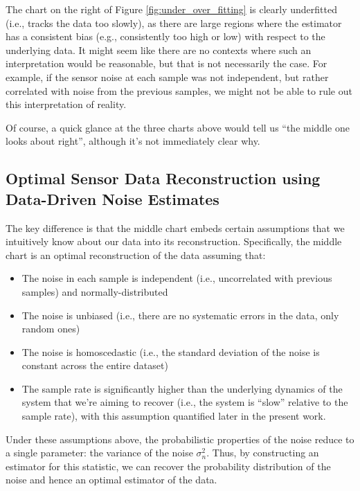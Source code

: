 \documentclass[conf]{new-aiaa}
\begin{document}
    The chart on the right of Figure \ref{fig:under_over_fitting} is clearly underfitted (i.e., tracks the data too slowly), as there are large regions where the estimator has a consistent bias (e.g., consistently too high or low) with respect to the underlying data. It might seem like there are no contexts where such an interpretation would be reasonable, but that is not necessarily the case. For example, if the sensor noise at each sample was not independent, but rather correlated with noise from the previous samples, we might not be able to rule out this interpretation of reality.

    Of course, a quick glance at the three charts above would tell us ``the middle one looks about right'', although it's not immediately clear why.

    \subsection{Optimal Sensor Data Reconstruction using Data-Driven Noise Estimates}
    \label{subsec:optimal_sensor_data_reconstruction}

    The key difference is that the middle chart embeds certain assumptions that we intuitively know about our data into its reconstruction. Specifically, the middle chart is an optimal reconstruction of the data assuming that:

    \begin{itemize}
        \item The noise in each sample is independent (i.e., uncorrelated with previous samples) and normally-distributed
        \item The noise is unbiased (i.e., there are no systematic errors in the data, only random ones)
        \item The noise is homoscedastic (i.e., the standard deviation of the noise is constant across the entire dataset)
        \item The sample rate is significantly higher than the underlying dynamics of the system that we're aiming to recover (i.e., the system is ``slow'' relative to the sample rate), with this assumption quantified later in the present work.
    \end{itemize}

    Under these assumptions above, the probabilistic properties of the noise reduce to a single parameter: the variance of the noise $\sigma^2_n$. Thus, by constructing an estimator for this statistic, we can recover the probability distribution of the noise and hence an optimal estimator of the data.
\end{document}

